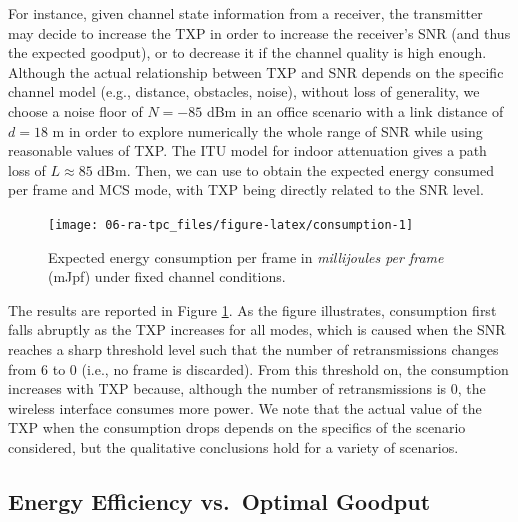 \documentclass[twoside,nohyper]{tufte-book}
\makeatletter
\let\orig@maketag@@@\maketag@@@
\renewcommand{\eqref}[1]{\textup{\let\maketag@@@\orig@maketag@@@\tagform@{\ref{#1}}}}
\def\maketag@@@#1{\hbox{\rlap{\kern\marginparsep\m@th\normalfont#1}\kern1sp}}
\makeatother
\begin{document}
For instance, given channel state information from a receiver, the transmitter may decide to increase the TXP in order to increase the receiver's SNR (and thus the expected goodput), or to decrease it if the channel quality is high enough. Although the actual relationship between TXP and SNR depends on the specific channel model (e.g., distance, obstacles, noise), without loss of generality, we choose a noise floor of \(N=-85\) dBm in an office scenario with a link distance of \(d=18\) m in order to explore numerically the whole range of SNR while using reasonable values of TXP. The ITU model for indoor attenuation\cite[-10mm]{iturp1238-2015} gives a path loss of \(L\approx 85\) dBm. Then, we can use \eqref{eq:energyperframe} to obtain the expected energy consumed per frame and MCS mode, with TXP being directly related to the SNR level.



\begin{figure}

{\centering \texttt{[image: 06-ra-tpc\_files/figure-latex/consumption-1]} 

}

\caption[Expected energy consumption per frame in \emph{millijoules per frame} (mJpf) under fixed channel conditions.]{Expected energy consumption per frame in \emph{millijoules per frame} (mJpf) under fixed channel conditions.}\label{fig:consumption}
\end{figure}

The results are reported in Figure \ref{fig:consumption}. As the figure illustrates, consumption first falls abruptly as the TXP increases for all modes, which is caused when the SNR reaches a sharp threshold level such that the number of retransmissions changes from 6 to 0 (i.e., no frame is discarded). From this threshold on, the consumption increases with TXP because, although the number of retransmissions is 0, the wireless interface consumes more power. We note that the actual value of the TXP when the consumption drops depends on the specifics of the scenario considered, but the qualitative conclusions hold for a variety of scenarios.

\hypertarget{energy-efficiency-vs.optimal-goodput}{%
\subsection{Energy Efficiency vs.~Optimal Goodput}\label{energy-efficiency-vs.optimal-goodput}}
\end{document}
